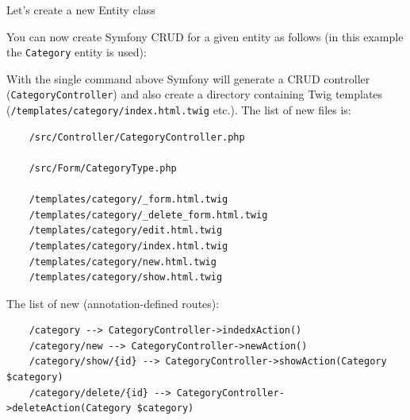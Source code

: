 \documentclass[a4paperpaper,openright]{book}
\newenvironment{Shaded}{}{}
\newcommand{\ExtensionTok}[1]{#1}
\newcommand{\NormalTok}[1]{#1}
\begin{document}
Let's create a new Entity class

You can now create Symfony CRUD for a given entity as follows (in this
example the \texttt{Category} entity is used):

\begin{Shaded}
\end{Shaded}

With the single command above Symfony will generate a CRUD controller
(\texttt{CategoryController}) and also create a directory containing
Twig templates (\texttt{/templates/category/index.html.twig} etc.). The
list of new files is:

\begin{verbatim}
    /src/Controller/CategoryController.php

    /src/Form/CategoryType.php

    /templates/category/_form.html.twig
    /templates/category/_delete_form.html.twig
    /templates/category/edit.html.twig
    /templates/category/index.html.twig
    /templates/category/new.html.twig
    /templates/category/show.html.twig
\end{verbatim}

The list of new (annotation-defined routes):

\begin{verbatim}
    /category --> CategoryController->indedxAction()
    /category/new --> CategoryController->newAction()
    /category/show/{id} --> CategoryController->showAction(Category $category)
    /category/delete/{id} --> CategoryController->deleteAction(Category $category)
\end{verbatim}
\end{document}

